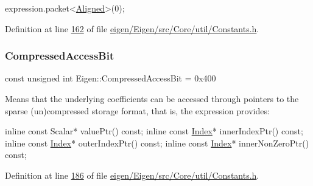 \begin{DoxyCode}
expression.packet<\hyperlink{group__enums_gga45fe06e29902b7a2773de05ba27b47a1ad37d4c71425bb286e9b4103830538fbf}{Aligned}>(0);
\end{DoxyCode}
 

Definition at line \hyperlink{eigen_2_eigen_2src_2_core_2util_2_constants_8h_source_l00162}{162} of file \hyperlink{eigen_2_eigen_2src_2_core_2util_2_constants_8h_source}{eigen/\+Eigen/src/\+Core/util/\+Constants.\+h}.

\mbox{\label{group__flags_gaed0244284da47a2b8661261431173caf}} 
\subsubsection{\texorpdfstring{Compressed\+Access\+Bit}{CompressedAccessBit}}
{\footnotesize\ttfamily const unsigned int Eigen\+::\+Compressed\+Access\+Bit = 0x400}

Means that the underlying coefficients can be accessed through pointers to the sparse (un)compressed storage format, that is, the expression provides\+: 
\begin{DoxyCode}
\textcolor{keyword}{inline} \textcolor{keyword}{const} Scalar* valuePtr() \textcolor{keyword}{const};
\textcolor{keyword}{inline} \textcolor{keyword}{const} \hyperlink{namespace_eigen_a62e77e0933482dafde8fe197d9a2cfde}{Index}* innerIndexPtr() \textcolor{keyword}{const};
\textcolor{keyword}{inline} \textcolor{keyword}{const} \hyperlink{namespace_eigen_a62e77e0933482dafde8fe197d9a2cfde}{Index}* outerIndexPtr() \textcolor{keyword}{const};
\textcolor{keyword}{inline} \textcolor{keyword}{const} \hyperlink{namespace_eigen_a62e77e0933482dafde8fe197d9a2cfde}{Index}* innerNonZeroPtr() \textcolor{keyword}{const};
\end{DoxyCode}
 

Definition at line \hyperlink{eigen_2_eigen_2src_2_core_2util_2_constants_8h_source_l00186}{186} of file \hyperlink{eigen_2_eigen_2src_2_core_2util_2_constants_8h_source}{eigen/\+Eigen/src/\+Core/util/\+Constants.\+h}.

\mbox{\label{group__flags_gabf1e9d0516a933445a4c307ad8f14915}} 
